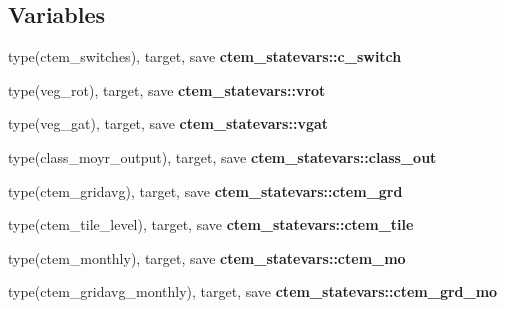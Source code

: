 \subsection*{Variables}
\begin{DoxyCompactItemize}
\item 
\hypertarget{namespacectem__statevars_ae5b8eaa631db6fcf2adc586a8ffdb722}{}type(ctem\+\_\+switches), target, save {\bfseries ctem\+\_\+statevars\+::c\+\_\+switch}\label{namespacectem__statevars_ae5b8eaa631db6fcf2adc586a8ffdb722}

\item 
\hypertarget{namespacectem__statevars_ac60177625fa0d946b94065134b1f37a2}{}type(veg\+\_\+rot), target, save {\bfseries ctem\+\_\+statevars\+::vrot}\label{namespacectem__statevars_ac60177625fa0d946b94065134b1f37a2}

\item 
\hypertarget{namespacectem__statevars_ae21be54e6097f1f897ddbb5a7265d301}{}type(veg\+\_\+gat), target, save {\bfseries ctem\+\_\+statevars\+::vgat}\label{namespacectem__statevars_ae21be54e6097f1f897ddbb5a7265d301}

\item 
\hypertarget{namespacectem__statevars_a1b383361faf075e17b8f4376d478f469}{}type(class\+\_\+moyr\+\_\+output), target, save {\bfseries ctem\+\_\+statevars\+::class\+\_\+out}\label{namespacectem__statevars_a1b383361faf075e17b8f4376d478f469}

\item 
\hypertarget{namespacectem__statevars_ab8cd13b4bb2133f86012aa72a85253de}{}type(ctem\+\_\+gridavg), target, save {\bfseries ctem\+\_\+statevars\+::ctem\+\_\+grd}\label{namespacectem__statevars_ab8cd13b4bb2133f86012aa72a85253de}

\item 
\hypertarget{namespacectem__statevars_a35e3e81a8d12b67b5bc48767779ffe4d}{}type(ctem\+\_\+tile\+\_\+level), target, save {\bfseries ctem\+\_\+statevars\+::ctem\+\_\+tile}\label{namespacectem__statevars_a35e3e81a8d12b67b5bc48767779ffe4d}

\item 
\hypertarget{namespacectem__statevars_a1935b531e4ef11e55fdaf77f816c9269}{}type(ctem\+\_\+monthly), target, save {\bfseries ctem\+\_\+statevars\+::ctem\+\_\+mo}\label{namespacectem__statevars_a1935b531e4ef11e55fdaf77f816c9269}

\item 
\hypertarget{namespacectem__statevars_a0e6e53463d563093cfacf19a1358ec1c}{}type(ctem\+\_\+gridavg\+\_\+monthly), target, save {\bfseries ctem\+\_\+statevars\+::ctem\+\_\+grd\+\_\+mo}\label{namespacectem__statevars_a0e6e53463d563093cfacf19a1358ec1c}


\end{DoxyCompactItemize}
